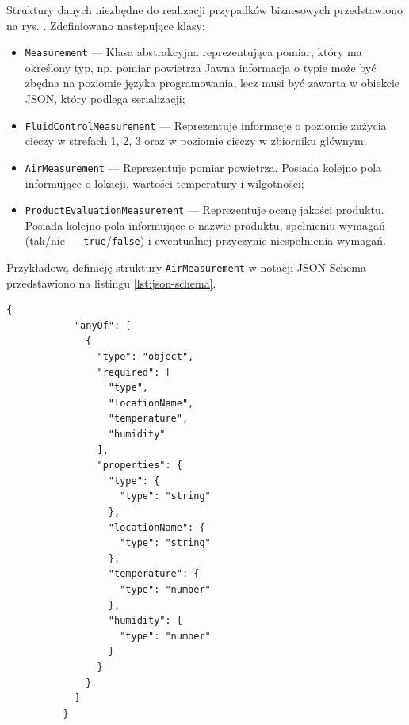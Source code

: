 \documentclass[a4paper, 12pt, twoside]{article}
\begin{document}
Struktury danych niezbędne do realizacji przypadków biznesowych
przedstawiono na rys. . Zdefiniowano następujące klasy:
\begin{itemize}
      \itemsep0em
      \item \texttt{Measurement} --- Klasa abstrakcyjna reprezentująca pomiar, który ma określony typ, np. pomiar powietrza
            Jawna informacja o typie może być zbędna na poziomie języka programowania, lecz musi być zawarta w obiekcie JSON, który podlega serializacji;
      \item \texttt{FluidControlMeasurement} --- Reprezentuje informację o poziomie zużycia cieczy w strefach 1, 2, 3 oraz w poziomie cieczy w zbiorniku głównym;
      \item \texttt{AirMeasurement} --- Reprezentuje pomiar powietrza. Posiada kolejno pola informujące o lokacji, wartości temperatury i wilgotności;
      \item \texttt{ProductEvaluationMeasurement} --- Reprezentuje ocenę jakości produktu. Posiada kolejno pola informujące o nazwie produktu,
            spełnieniu wymagań (tak/nie --- \texttt{true}/\texttt{false}) i ewentualnej przyczynie niespełnienia wymagań.
\end{itemize}
\noindent Przykładową definicję struktury \texttt{AirMeasurement} w notacji 
JSON Schema przedstawiono na listingu \ref{lst:json-schema}.

\begin{lstlisting}[caption={Przykład definicji obiektu JSON w notacji JSON Schema dla 
      struktury \texttt{AirMeasurement}}, label={lst:json-schema}]
      {
            "anyOf": [
              {
                "type": "object",
                "required": [
                  "type",
                  "locationName",
                  "temperature",
                  "humidity"
                ],
                "properties": {
                  "type": {
                    "type": "string"
                  },
                  "locationName": {
                    "type": "string"
                  },
                  "temperature": {
                    "type": "number"
                  },
                  "humidity": {
                    "type": "number"
                  }
                }
              }
            ]
          }    
\end{lstlisting}
\end{document}
